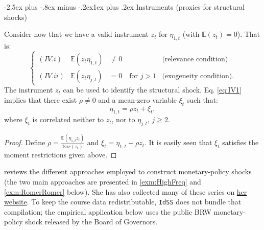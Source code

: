 \documentclass[
  11pt,
]{book}
\makeatletter
\renewcommand\subsection{\@startsection{subsection}{2}{\z@}
  {-2.5ex plus -.8ex minus -.2ex}{1ex plus .2ex}
  {\normalfont\large\bfseries\color{TextbookInk}}}
\theoremstyle{definition}
\theoremstyle{definition}
\theoremstyle{definition}
\theoremstyle{definition}
\theoremstyle{remark}
\makeatother
\begin{document}
\subsection{Instruments (proxies for structural shocks)}\label{instruments-proxies-for-structural-shocks}

Consider now that we have a valid instrument \(z_t\) for \(\eta_{1,t}\) (with \(\mathbb{E}(z_t)=0\)). That is:
\begin{equation}
\left\{
\begin{array}{llll}
(IV.i) & \mathbb{E}(z_t \eta_{1,t}) &\ne 0 & \mbox{(relevance condition)} \\
(IV.ii) & \mathbb{E}(z_t \eta_{j,t}) &= 0 \quad \mbox{for } j>1 & \mbox{(exogeneity condition).}
\end{array}\right.\label{eq:IV1}
\end{equation}
The instrument \(z_t\) can be used to identify the structural shock. Eq. \eqref{eq:IV1} implies that there exist \(\rho \ne 0\) and a mean-zero variable \(\xi_t\) such that:
\[
\eta_{1,t} = \rho z_t + \xi_t,
\]
where \(\xi_t\) is correlated neither to \(z_t\), nor to \(\eta_{j,t}\), \(j\ge2\).

\begin{proof}
Define \(\rho = \frac{\mathbb{E}(\eta_{1,t}z_t)}{\mathbb{V}ar(z_t)}\) and \(\xi_t = \eta_{1,t} - \rho z_t\). It is easily seen that \(\xi_t\) satisfies the moment restrictions given above.
\end{proof}

\citet{Ramey_2016_NBER} reviews the different approaches employed to construct monetary-policy shocks (the two main approaches are presented in \ref{exm:HighFreq} and \ref{exm:RomerRomer} below). She has also collected many of these series on \href{https://econweb.ucsd.edu/~vramey/research.html\#mon}{her website}. To keep the course data redistributable, \texttt{IdSS} does not bundle that compilation; the empirical application below uses the public BRW monetary-policy shock released by the Board of Governors.
\end{document}
